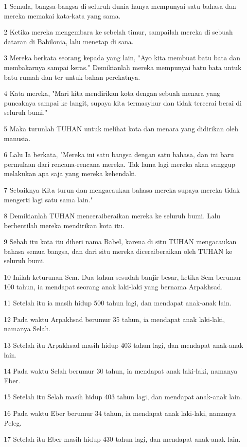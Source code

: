 \par 1 Semula, bangsa-bangsa di seluruh dunia hanya mempunyai satu bahasa dan mereka memakai kata-kata yang sama.
\par 2 Ketika mereka mengembara ke sebelah timur, sampailah mereka di sebuah dataran di Babilonia, lalu menetap di sana.
\par 3 Mereka berkata seorang kepada yang lain, "Ayo kita membuat batu bata dan membakarnya sampai keras." Demikianlah mereka mempunyai batu bata untuk batu rumah dan ter untuk bahan perekatnya.
\par 4 Kata mereka, "Mari kita mendirikan kota dengan sebuah menara yang puncaknya sampai ke langit, supaya kita termasyhur dan tidak tercerai berai di seluruh bumi."
\par 5 Maka turunlah TUHAN untuk melihat kota dan menara yang didirikan oleh manusia.
\par 6 Lalu Ia berkata, "Mereka ini satu bangsa dengan satu bahasa, dan ini baru permulaan dari rencana-rencana mereka. Tak lama lagi mereka akan sanggup melakukan apa saja yang mereka kehendaki.
\par 7 Sebaiknya Kita turun dan mengacaukan bahasa mereka supaya mereka tidak mengerti lagi satu sama lain."
\par 8 Demikianlah TUHAN menceraiberaikan mereka ke seluruh bumi. Lalu berhentilah mereka mendirikan kota itu.
\par 9 Sebab itu kota itu diberi nama Babel, karena di situ TUHAN mengacaukan bahasa semua bangsa, dan dari situ mereka diceraiberaikan oleh TUHAN ke seluruh bumi.
\par 10 Inilah keturunan Sem. Dua tahun sesudah banjir besar, ketika Sem berumur 100 tahun, ia mendapat seorang anak laki-laki yang bernama Arpakhsad.
\par 11 Setelah itu ia masih hidup 500 tahun lagi, dan mendapat anak-anak lain.
\par 12 Pada waktu Arpakhsad berumur 35 tahun, ia mendapat anak laki-laki, namanya Selah.
\par 13 Setelah itu Arpakhsad masih hidup 403 tahun lagi, dan mendapat anak-anak lain.
\par 14 Pada waktu Selah berumur 30 tahun, ia mendapat anak laki-laki, namanya Eber.
\par 15 Setelah itu Selah masih hidup 403 tahun lagi, dan mendapat anak-anak lain.
\par 16 Pada waktu Eber berumur 34 tahun, ia mendapat anak laki-laki, namanya Peleg.
\par 17 Setelah itu Eber masih hidup 430 tahun lagi, dan mendapat anak-anak lain.
